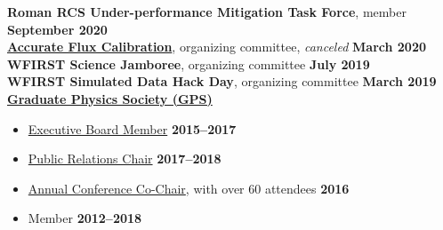 \documentclass[margin]{res}
\begin{document}
\begin{resume}

\textbf{Roman RCS Under-performance Mitigation Task Force}, member \hfill \textbf{September 2020}\\
\textbf{\href{https://www.stsci.edu/contents/events/stsci/2020/march/accurate-flux-calibration-for-21st-century-astrophysics?timeframe=}{Accurate Flux Calibration}}, organizing committee, \textit{canceled} \hfill \textbf{March 2020}\\
\textbf{WFIRST Science Jamboree}, organizing committee \hfill \textbf{July 2019}\\
\textbf{WFIRST Simulated Data Hack Day}, organizing committee \hfill \textbf{March 2019}\\
\textbf{\href{gradphysics.nd.edu}{Graduate Physics Society (GPS)}}
\begin{itemize}\itemsep -2pt
    \item[] \href{http://gradphysics.nd.edu/about-us/executive-board/}{Executive Board Member} \hfill {\bf 2015--2017}
    \item[] \href{http://gradphysics.nd.edu/about-us/committee-chairs/}{Public Relations Chair} \hfill {\bf 2017--2018}
    \item[] \href{http://gradphysics.nd.edu/conference/gpsac-2016/}{Annual Conference Co-Chair}, with over 60 attendees \hfill {\bf 2016}
    \item[] Member \hfill {\bf 2012--2018}
\end{itemize} \vspace{-12pt}

\end{resume}
\end{document}
